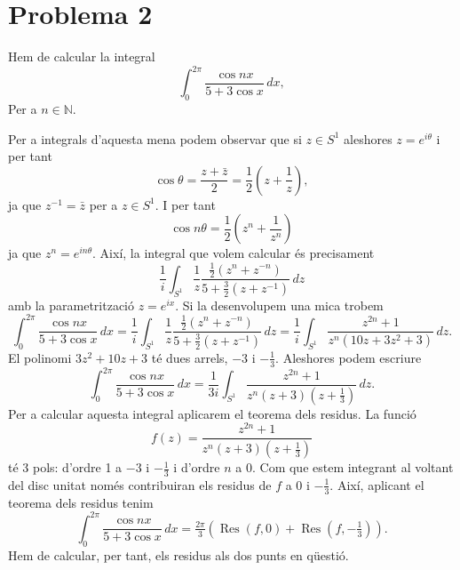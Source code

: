 \documentclass[12pt]{article}
\numberwithin{table}{section}
\numberwithin{figure}{section}
\numberwithin{equation}{section}
\newcommand{\N}{\mathbb{N}}
\DeclareMathOperator{\Res}{Res}
\begin{document}
\section*{Problema 2}
Hem de calcular la integral
\begin{equation*}
	\int_0^{2\pi} \frac{\cos{nx}}{5 + 3\cos{x}} \, dx,
\end{equation*}
Per a \( n \in \N \).

Per a integrals d'aquesta mena podem observar que si \( z \in S^1 \) aleshores \( z = e^{i\theta} \) i per tant
\begin{equation*}
	\cos{\theta} = \frac{z + \bar{z}}{2} = \frac{1}{2}\left(z + \frac{1}{z}\right),
\end{equation*}
ja que \( z^{-1} = \bar{z} \) per a \( z \in S^1 \). I per tant
\begin{equation*}
	\cos{n\theta} = \frac{1}{2}\left(z^n + \frac{1}{z^n}\right)
\end{equation*}
ja que \( z^n = e^{in\theta} \). Així, la integral que volem calcular és precisament
\begin{equation*}
	\frac{1}{i} \int_{S^1} \frac{1}{z}\frac{\frac{1}{2}(z^n + z^{-n})}{5 + \frac{3}{2}(z + z^{-1})} \, dz
\end{equation*}
amb la parametrització \( z = e^{ix} \). Si la desenvolupem una mica trobem
\begin{equation*}
	\int_0^{2\pi} \frac{\cos{nx}}{5 + 3\cos{x}} \, dx =	\frac{1}{i} \int_{S^1} \frac{1}{z}\frac{\frac{1}{2}(z^n + z^{-n})}{5 + \frac{3}{2}(z + z^{-1})} \, dz = \frac{1}{i} \int_{S^1} \frac{z^{2n} + 1}{z^n(10z + 3z^2 + 3)} \, dz.
\end{equation*}
El polinomi \( 3z^2 + 10z + 3 \) té dues arrels, \( -3 \) i \( -\frac{1}{3} \). Aleshores podem escriure
\begin{equation*}
	\int_0^{2\pi} \frac{\cos{nx}}{5 + 3\cos{x}} \, dx = \frac{1}{3i} \int_{S^1} \frac{z^{2n} + 1}{z^n (z+3)(z+\tfrac{1}{3})} \, dz.
\end{equation*}
Per a calcular aquesta integral aplicarem el teorema dels residus. La funció
\begin{equation*}
	f(z) = \frac{z^{2n} + 1}{z^n(z+3)(z + \frac{1}{3})}
\end{equation*}
té 3 pols: d'ordre 1 a \( -3 \) i \( -\frac{1}{3} \) i d'ordre \( n \) a 0. Com que estem integrant al voltant del disc unitat només contribuiran els residus de \( f \) a 0 i \( -\frac{1}{3} \). Així, aplicant el teorema dels residus tenim
\begin{equation*}
	\int_0^{2\pi} \frac{\cos{nx}}{5 + 3\cos{x}} \, dx = \tfrac{2\pi}{3}(\Res{(f,0)} + \Res{(f, - \tfrac{1}{3})}).
\end{equation*}
Hem de calcular, per tant, els residus als dos punts en qüestió.
\end{document}

